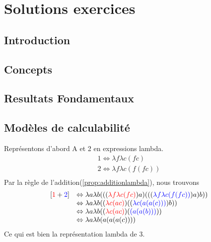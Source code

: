 
\chapter{Solutions exercices}
\label{ch:solExer}

%

\section{Introduction}





\section{Concepts}




\section{Resultats Fondamentaux}




\section{Modèles de calculabilité}

Représentons d'abord A et 2 en expressions lambda.
$$\begin{array}{ll}
	1 \Leftrightarrow \lambda f \lambda c (fc)\\
	2 \Leftrightarrow \lambda f \lambda c (f(fc))\\
\end{array}$$
Par la règle de l'addition(\ref{prop:additionlambda}), nous trouvons
$$\begin{array}{ll}
	[\textcolor{red}{1}+\textcolor{blue}{2}] & \Leftrightarrow \lambda a \lambda b ( ( ( \textcolor{red}{\lambda f \lambda c (fc)} )a ) ( ( ( \textcolor{blue}{\lambda f \lambda c (f(fc))})a)b) ) \\
	& \Leftrightarrow \lambda a \lambda b ((\textcolor{red}{\lambda c (a c)}) ((\textcolor{blue}{\lambda c (a(a(c)))})b)) \\
	& \Leftrightarrow \lambda a \lambda b ((\textcolor{red}{\lambda c (a c)}) (\textcolor{blue}{(a(a(b)))}))\\
	& \Leftrightarrow \lambda a \lambda b (a(a(a(c))))
\end{array}$$
Ce qui est bien la représentation lambda de 3.
